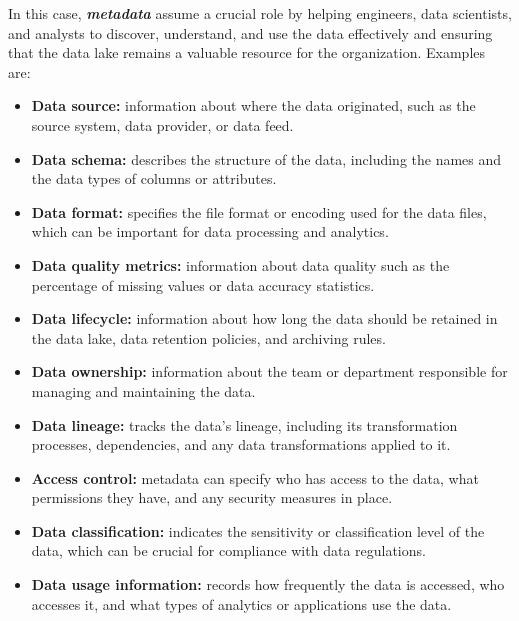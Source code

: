 In this case, \textbf{\textit{metadata}} assume a crucial role by helping engineers, data scientists, and analysts to discover, understand, and use the data effectively and ensuring that the data lake remains a valuable resource for the organization. Examples are:
\begin{itemize}
    \item \textbf{Data source:} information about where the data originated, such as the source system, data provider, or data feed.
    \item \textbf{Data schema:} describes the structure of the data, including the names and the data types of columns or attributes.
    \item \textbf{Data format:} specifies the file format or encoding used for the data files, which can be important for data processing and analytics.
    \item \textbf{Data quality metrics:} information about data quality such as the percentage of missing values or data accuracy statistics.
    \item \textbf{Data lifecycle:} information about how long the data should be retained in the data lake, data retention policies, and archiving rules.
    \item \textbf{Data ownership:} information about the team or department responsible for managing and maintaining the data.
    \item \textbf{Data lineage:} tracks the data's lineage, including its transformation processes, dependencies, and any data transformations applied to it.
    \item \textbf{Access control:} metadata can specify who has access to the data, what permissions they have, and any security measures in place.
    \item \textbf{Data classification:} indicates the sensitivity or classification level of the data, which can be crucial for compliance with data regulations.
    \item \textbf{Data usage information:} records how frequently the data is accessed, who accesses it, and what types of analytics or applications use the data.
\end{itemize}